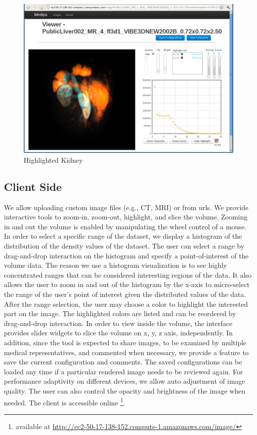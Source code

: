 \documentclass[annual]{acmsiggraph}
\begin{document}
\begin{figure}[htb]
\includegraphics[scale=0.475]{kidneys.png}
	\caption{\label{fig:head}Highlighted Kidney}
\end{figure}

\subsection{Client Side}
	We allow uploading custom image files (e.g., CT, MRI) or from urls. We provide interactive tools to zoom-in, zoom-out, highlight, and slice the volume. Zooming in and out the volume is enabled by manipulating the wheel control of a mouse. In order to select a specific range of the dataset, we display a histogram of the distribution of the density values of the dataset. The user can select a range by drag-and-drop interaction on the histogram and specify a point-of-interest of the volume data. The reason we use a histogram visualization is to see highly concentrated ranges that can be considered interesting regions of the data. It also allows the user to zoom in and out of the histogram by the x-axis to micro-select the range of the user's point of interest given the distributed values of the data. After the range selection, the user may choose a color to highlight the interested part on the image. The highlighted colors are listed and can be reordered by drag-and-drop interaction. In order to view inside the volume, the interface provides slider widgets to slice the volume on x, y, z axis, independently. 
		In addition, since the tool is expected to share images, to be examined by multiple medical representatives, and commented when necessary, we provide a feature to save the current configuration and comments. The saved configurations can be loaded any time if a particular rendered image needs to be reviewed again. For performance adaptivity on different devices, we allow auto adjustment of image quality. The user can also control the opacity and brightness of the image when needed. The client is accessible online \footnote{available at \url{http://ec2-50-17-138-152.compute-1.amazonaws.com/image/}}.
\end{document}
